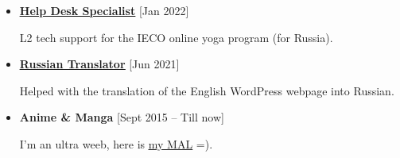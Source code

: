 \begin{itemize}
    \item \textbf{\href{https://www.innerengineering.com/completion}{\underline{Help Desk Specialist}}}  \hfill {\small [Jan 2022]}
    
    L2 tech support for the IECO online yoga program (for Russia).

    \item \textbf{\href{https://www.ishayoga.eu/index.php/yogaveera-ru/}{\underline{Russian Translator}}}  \hfill {\small [Jun 2021]}
    
   Helped with the translation of the English WordPress webpage into Russian.

\end{itemize}

\begin{itemize}
    \item \textbf{Anime \& Manga}
    \hfill
    {\small [Sept 2015 -- Till now]}

    I'm an ultra weeb, here is  \href{https://myanimelist.net/profile/Freik}{\underline{my MAL}} =).
    
    \divider
\end{itemize}
    



